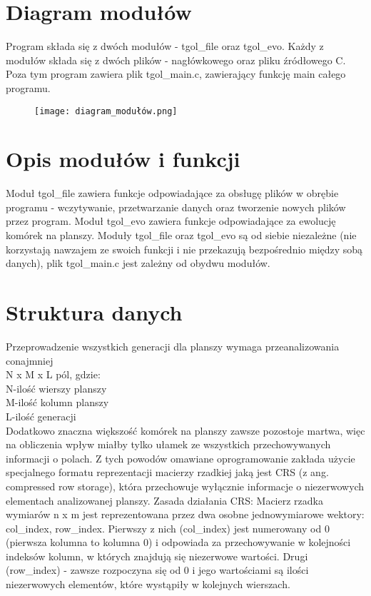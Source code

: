 \documentclass[11pt,a4paper]{report}
\begin{document}
\section{Diagram modułów}\label{sec:teskt}
Program składa się z dwóch modułów - tgol\_file oraz tgol\_evo.
Każdy z modułów składa się z dwóch plików - nagłówkowego oraz pliku źródłowego C.
Poza tym program zawiera plik tgol\_main.c, zawierający funkcję main całego programu.
\begin{figure}[htbp]
\centerline{\texttt{[image: diagram\_modułów.png]}}
\label{fig}

\end{figure}
\newpage

\section{Opis modułów i funkcji}\label{sec:teskt}
Moduł tgol\_file zawiera funkcje odpowiadające za obsługę plików w obrębie programu - wczytywanie, przetwarzanie danych oraz tworzenie nowych plików przez program.
Moduł tgol\_evo zawiera funkcje odpowiadające za ewolucję komórek na planszy.
Moduły tgol\_file oraz tgol\_evo są od siebie niezależne (nie korzystają nawzajem ze swoich funkcji i nie przekazują bezpośrednio między sobą danych), plik tgol\_main.c jest zależny od obydwu modułów.


\section{Struktura danych}\label{sec:teskt}
Przeprowadzenie wszystkich generacji dla planszy wymaga przeanalizowania conajmniej\\ N x M x L pól, gdzie:\\
	N-ilość wierszy planszy\\
 	M-ilość kolumn planszy\\
	L-ilość generacji\\
Dodatkowo znaczna większość komórek na planszy zawsze pozostoje martwa, więc na obliczenia wpływ miałby tylko ułamek ze wszystkich przechowywanych informacji o 
polach. Z tych powodów omawiane oprogramowanie zakłada użycie specjalnego formatu reprezentacji macierzy rzadkiej jaką jest CRS (z ang. compressed row storage), która
przechowuje wyłącznie informacje o niezerwowych elementach analizowanej planszy.
Zasada działania CRS:
Macierz rzadka wymiarów n x m jest reprezentowana przez dwa osobne jednowymiarowe wektory: col\_index, row\_index. Pierwszy z nich (col\_index) jest numerowany od 0 (pierwsza kolumna to kolumna 0) i odpowiada za przechowywanie w kolejności indeksów kolumn,
w których znajdują się niezerwowe wartości. Drugi (row\_index) - zawsze rozpoczyna się od 0 i jego wartościami są ilości niezerwowych elementów, które wystąpiły w  kolejnych wierszach.
\end{document}
